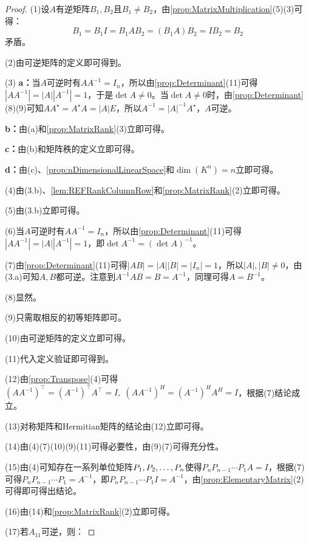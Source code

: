 \begin{proof}
	(1)设$A$有逆矩阵$B_1,B_2$且$B_1\ne B_2$，由\cref{prop:MatrixMultiplication}(5)(3)可得：
	\begin{equation*}
		B_1=B_1I=B_1AB_2=(B_1A)B_2=IB_2=B_2
	\end{equation*}
	矛盾。\par
	(2)由可逆矩阵的定义即可得到。\par
	(3)\textbf{ a：}当$A$可逆时有$AA^{-1}=I_n$，所以由\cref{prop:Determinant}(11)可得$|AA^{-1}|=|A||A^{-1}|=1$，于是$\det A\ne0$。当$\det A\ne0$时，由\cref{prop:Determinant}(8)(9)可知$AA^{\star}=A^{\star}A=|A|E$，所以$A^{-1}=|A|^{-1}A^{\star}$，$A$可逆。\par
	\textbf{b：}由(a)和\cref{prop:MatrixRank}(3)立即可得。\par
	\textbf{c：}由(b)和矩阵秩的定义立即可得。\par
	\textbf{d：}由(c)、\cref{prop:nDimensionalLinearSpace}和$\dim(K^n)=n$立即可得。\par
	(4)由(3.b)、\cref{lem:REFRankColumnRow}和\cref{prop:MatrixRank}(2)立即可得。\par
	(5)由(3.b)立即可得。\par
	(6)当$A$可逆时有$AA^{-1}=I_n$，所以由\cref{prop:Determinant}(11)可得$|AA^{-1}|=|A||A^{-1}|=1$，即$\det A^{-1}=(\det A)^{-1}$。\par
	(7)由\cref{prop:Determinant}(11)可得$|AB|=|A||B|=|I_n|=1$，所以$|A|,|B|\ne0$，由(3.a)可知$A,B$都可逆。注意到$A^{-1}AB=B=A^{-1}$，同理可得$A=B^{-1}$。\par
	(8)显然。\par
	(9)只需取相反的初等矩阵即可。\par
	(10)由可逆矩阵的定义立即可得。\par
	(11)代入定义验证即可得到。\par
	(12)由\cref{prop:Transpose}(4)可得$(AA^{-1})^{\top}=(A^{-1})^{\top}A^{\top}=I,\;(AA^{-1})^H=(A^{-1})^HA^H=I$，根据(7)结论成立。\par
	(13)对称矩阵和Hermitian矩阵的结论由(12)立即可得。\par
	(14)由(4)(7)(10)(9)(11)可得必要性，由(9)(7)可得充分性。\par
	(15)由(4)可知存在一系列单位矩阵$P_1, P_2, \dots, P_{n}$使得$P_nP_{n-1}\cdots P_1A=I$，根据(7)可得$P_nP_{n-1}\cdots P_1=A^{-1}$，即$P_nP_{n-1}\cdots P_1I=A^{-1}$，由\cref{prop:ElementaryMatrix}(2)可得即可得出结论。\par
	(16)由(14)和\cref{prop:MatrixRank}(2)立即可得。\par
	(17)若$A_{11}$可逆，则：

\end{proof}
